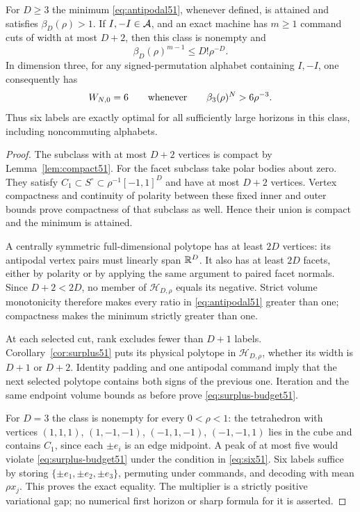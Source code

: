 \begin{theorem}
\label{thm:surplus-budget51}
For $D\ge3$ the minimum \eqref{eq:antipodal51}, whenever defined,
is attained and satisfies $\beta_D(\rho)>1$.
If $I,-I\in\mathcal A$, and an exact machine has $m\ge1$ command cuts
of width at most $D+2$, then this class is nonempty and
\begin{equation}\label{eq:surplus-budget51}
 \beta_D(\rho)^{m-1}\le D!\rho^{-D}.
\end{equation}
In dimension three, for any signed-permutation alphabet containing
$I,-I$, one consequently has
\begin{equation}\label{eq:six51}
 W_{N,0}=6\qquad\hbox{whenever}\qquad
 \beta_3(\rho)^N>6\rho^{-3}.
\end{equation}
Thus six labels are exactly optimal for all sufficiently large
horizons in this class, including noncommuting alphabets.
\end{theorem}
\begin{proof}
The subclass with at most $D+2$ vertices is compact by
Lemma~\ref{lem:compact51}. For the facet subclass take polar bodies
about zero. They satisfy
$C_1\subset S^\circ\subset\rho^{-1}[-1,1]^D$ and have at most
$D+2$ vertices. Vertex compactness and continuity of polarity between
these fixed inner and outer bounds prove compactness of that
subclass as well. Hence their union is compact and the minimum is
attained.

A centrally symmetric full-dimensional polytope has at least $2D$
vertices: its antipodal vertex pairs must linearly span $\mathbb R^D$.
It also has at least $2D$ facets, either by polarity or by applying
the same argument to paired facet normals. Since $D+2<2D$, no member
of $\mathscr H_{D,\rho}$ equals its negative. Strict volume
monotonicity therefore makes every ratio in
\eqref{eq:antipodal51} greater than one; compactness makes the
minimum strictly greater than one.

At each selected cut, rank excludes fewer than $D+1$ labels.
Corollary~\ref{cor:surplus51} puts its physical polytope in
$\mathscr H_{D,\rho}$, whether its width is $D+1$ or $D+2$.
Identity padding and one antipodal command imply that the next
selected polytope contains both signs of the previous one.
Iteration and the same endpoint volume bounds as before prove
\eqref{eq:surplus-budget51}.

For $D=3$ the class is nonempty for every $0<\rho<1$: the tetrahedron
with vertices $(1,1,1)$, $(1,-1,-1)$, $(-1,1,-1)$, $(-1,-1,1)$
lies in the cube and contains $C_1$, since each $\pm e_i$ is an
edge midpoint. A peak of at most five would violate
\eqref{eq:surplus-budget51} under the condition in \eqref{eq:six51}.
Six labels suffice by storing $\{\pm e_1,\pm e_2,\pm e_3\}$,
permuting under commands, and decoding with mean $\rho x_j$.
This proves the exact equality. The multiplier is a strictly positive
variational gap; no numerical first horizon or sharp formula for it
is asserted.
\end{proof}
